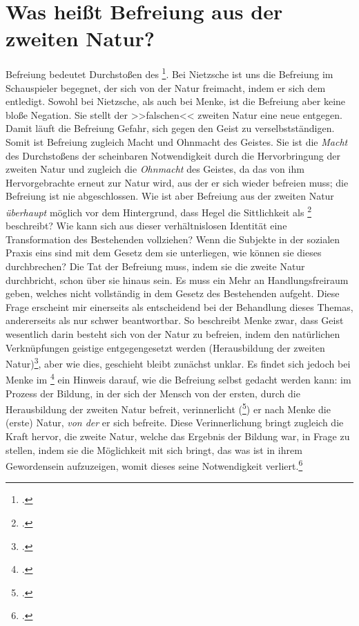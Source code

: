 \documentclass[12pt, a4paper, openany]{report}
\begin{document}
\section{Was heißt Befreiung aus der zweiten Natur?}\label{abschnitt_3}
Befreiung bedeutet Durchstoßen des \footcite[Vgl.][41]{menke_autonomie_2018}.
Bei Nietzsche ist uns die Befreiung im Schauspieler begegnet, der sich von der Natur freimacht, indem er sich dem  entledigt.
Sowohl bei Nietzsche, als auch bei Menke, ist die Befreiung aber keine bloße Negation. 
Sie stellt der >>falschen<< zweiten Natur eine neue entgegen.
Damit läuft die Befreiung Gefahr, sich gegen den Geist zu verselbstständigen. 
Somit ist Befreiung zugleich Macht und Ohnmacht des Geistes.
Sie ist die \emph{Macht} des Durchstoßens der scheinbaren Notwendigkeit durch die Hervorbringung der zweiten Natur und zugleich die \emph{Ohnmacht} des Geistes, da das von ihm Hervorgebrachte erneut zur Natur wird, aus der er sich wieder befreien muss; die Befreiung ist nie abgeschlossen.
Wie ist aber Befreiung aus der zweiten Natur \emph{überhaupt} möglich vor dem Hintergrund, dass Hegel die Sittlichkeit als \footcite[][§ 147 (Anmerkung), S. 163]{hegel_grundlinien_2017} beschreibt?
Wie kann sich aus dieser verhältnislosen Identität eine Transformation des Bestehenden vollziehen?
Wenn die Subjekte in der sozialen Praxis eins sind mit dem Gesetz dem sie unterliegen, wie können sie dieses durchbrechen? 
Die Tat der Befreiung muss, indem sie die zweite Natur durchbricht, schon über sie hinaus sein.
Es muss ein Mehr an Handlungsfreiraum geben, welches nicht vollständig in dem Gesetz des Bestehenden aufgeht.
Diese Frage erscheint mir einerseits als entscheidend bei der Behandlung dieses Themas, andererseits als nur schwer beantwortbar.
So beschreibt Menke zwar, dass Geist wesentlich darin besteht sich von der Natur zu befreien, indem den natürlichen Verknüpfungen geistige entgegengesetzt werden (Herausbildung der zweiten Natur)\footcite[Vgl.][39]{menke_autonomie_2018}, aber wie dies, geschieht bleibt zunächst unklar. 
Es findet sich jedoch bei Menke im \footcite[][51]{menke_autonomie_2018} ein Hinweis darauf, wie die Befreiung selbst gedacht werden kann:
im Prozess der Bildung, in der sich der Mensch von der ersten, durch die Herausbildung der zweiten Natur befreit, verinnerlicht (\footcite[][80]{menke_autonomie_2018}) er nach Menke die (erste) Natur, \emph{von der} er sich befreite.
Diese Verinnerlichung bringt zugleich die Kraft hervor, die zweite Natur, welche das Ergebnis der Bildung war, in Frage zu stellen, indem sie die Möglichkeit mit sich bringt, das was ist in ihrem Gewordensein aufzuzeigen, womit dieses seine Notwendigkeit verliert.\footcite[Vgl.][80]{menke_autonomie_2018}
\end{document}
